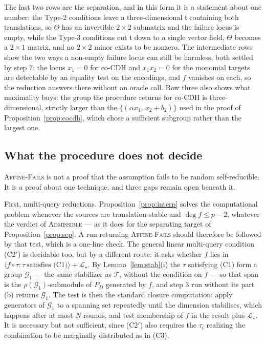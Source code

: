 \documentclass{aicr-solution}
\newcommand{\LL}{\mathcal{L}}
\newcommand{\Span}[1]{\langle #1 \rangle} %
\newcommand{\tge}{\mathfrak{t}}
\begin{document}
\noindent
The last two rows are the separation, and in this form it is a statement about one number: the
Type-2 conditions leave a three-dimensional $\tge$ containing both translations, so
$\Theta$ has an invertible $2\times 2$ submatrix and the failure locus is empty, while the
Type-3 conditions cut $\tge$ down to a single vector field, $\Theta$ becomes a $2\times 1$
matrix, and no $2\times 2$ minor exists to be nonzero. The intermediate rows show the two ways a
non-empty failure locus can still be harmless, both settled by step 7: the locus $x_1=0$ for
co-CDH and $x_1x_2=0$ for the monomial targets are detectable by an equality test on the
encodings, and $f$ vanishes on each, so the reduction answers there without an oracle call.
Row three also shows what maximality buys: the group the procedure returns for co-CDH is
three-dimensional, strictly larger than the $\{(\alpha x_1,\,x_2+b_2)\}$ used in the proof of
Proposition~\ref{prop:cocdh}, which chose a sufficient subgroup rather than the largest one.

\subsection{What the procedure does not decide}
\label{sec:limits}

\textsc{Affine-Fails} is not a proof that the assumption fails to be random self-reducible. It
is a proof about one technique, and three gaps remain open beneath it.

First, multi-query reductions. Proposition~\ref{prop:interp} solves the computational problem
whenever the sources are translation-stable and $\deg f\le p-2$, whatever the verdict of
\textsc{Admissible} --- as it does for the separating target of Proposition~\ref{prop:sep}. A
run returning \textsc{Affine-Fails} should therefore be followed by that test, which is a
one-line check. The general linear multi-query condition \textup{(C2$'$)} is decidable too, but
by a different route: it asks whether $f$ lies in
$\Span{f\circ\tau:\tau\ \text{satisfies (C1)}}+\LL_\star$. By Lemma~\ref{lem:stab}(i) the
$\tau$ satisfying \textup{(C1)} form a group $\mathcal G_1$ --- the same stabilizer as
$\mathcal T$, without the condition on $\bar f$ --- so that span is the $\rho(\mathcal
G_1)$-submodule of $P_D$ generated by $f$, and step 3 run without its part (b) returns
$\mathcal G_1$. The test is then the standard closure computation: apply generators of
$\mathcal G_1$ to a spanning set repeatedly until the dimension stabilises, which happens after
at most $N$ rounds, and test membership of $f$ in the result plus $\LL_\star$. It is necessary
but not sufficient, since \textup{(C2$'$)} also requires the $\tau_i$ realizing the combination
to be marginally distributed as in \textup{(C3)}.
\end{document}
